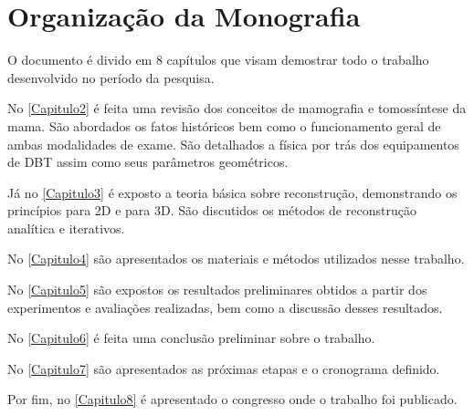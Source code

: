 %


\section{Organização da Monografia}

O documento é divido em 8 capítulos que visam demostrar todo o trabalho desenvolvido no período da pesquisa. 

No \autoref{Capitulo2} é feita uma revisão dos conceitos de mamografia e tomossíntese da mama. São abordados os fatos históricos bem como o funcionamento geral de ambas modalidades de exame. São detalhados a física por trás dos equipamentos de \acs{DBT} assim como seus parâmetros geométricos.

Já no \autoref{Capitulo3} é exposto a teoria básica sobre reconstrução, demonstrando os princípios para \acs{2D} e para \acs{3D}. São discutidos os métodos de reconstrução analítica e iterativos. 

No \autoref{Capitulo4} são apresentados os materiais e métodos utilizados nesse trabalho. 

No \autoref{Capitulo5} são expostos os resultados preliminares obtidos a partir dos experimentos e avaliações realizadas, bem como a discussão desses resultados.

No \autoref{Capitulo6} é feita uma conclusão preliminar sobre o trabalho.

No \autoref{Capitulo7} são apresentados as próximas etapas e o cronograma definido. 

Por fim, no \autoref{Capitulo8} é apresentado o congresso onde o trabalho foi publicado.



  

  

